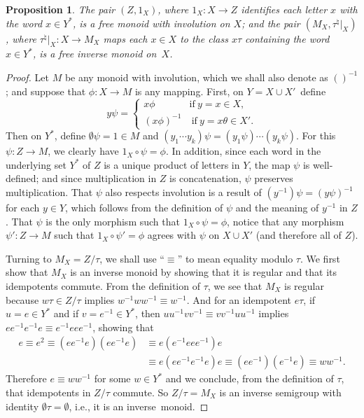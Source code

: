 \documentclass{surv-l}
\numberwithin{equation}{section}
\numberwithin{table}{section}
\numberwithin{figure}{section}
\newtheorem{proposition}[equation]{Proposition}
\theoremstyle{definition}
\begin{document}
\begin{proposition}\label{prop9.42.6}
The pair $(Z,1_{X})$, where $1_{X} : X\rightarrow Z$ identifies
each letter $x$ with the word $x\in Y^{\ast}$, is a free monoid
with involution on $X$; and the pair $(M_{X},
\tau^{\natural}|_{X})$, where $\tau^{\natural}|_{X} :
X\rightarrow M_{X}$ maps each $x\in X$ to the class $ x\tau$
containing the word $x\in Y^{\ast}$, is a free inverse
monoid on~$X$.
\end{proposition}

\begin{proof} Let $M$ be any monoid with involution, which we shall also
denote as $()^{-1}$; and suppose that $\phi : X\rightarrow M$ is
any mapping. First, on $Y=X\cup X'$~define
\[
y\psi=\begin{cases}
x\phi &\mathrm{if}\ y=x\in X,\\
(x\phi)^{-1} &\ \mathrm{if}\ y=x\theta\in X'.
\end{cases}
\]
Then on $Y^{\ast}$, define $\emptyset\psi=1\in M$ and
$(y_{1}\cdots y_{k})\psi=(y_{1}\psi)\cdots(y_{k}\psi)$. For this
$\psi : Z\rightarrow M$, we clearly have $1_{X}\circ\psi=\phi$. In
addition, since each word in the underlying set $Y^{\ast}$ of $Z$
is a unique product of letters in $Y$, the map $\psi$ is
well-defined; and since multiplication in $Z$ is concatenation,
$\psi$ preserves multiplication. That $\psi$ also respects
involution is a result of $(y^{-1})\psi=(y\psi)^{-1}$ for each
$y\in Y$, which follows from the definition of $\psi$ and the
meaning of $y^{-1}$ in $Z$. That $\psi$ is the only morphism such
that $ 1_{X}\circ\psi=\phi$, notice that any morphism $\psi' :
Z\rightarrow M$ such that $ 1_{X}\circ\psi'=\phi$ agrees with
$\psi$ on $X\cup X'$ (and therefore all of $Z$).

Turning to $M_{X}=Z/\tau$, we shall use ``$\equiv$'' to mean
equality modulo $\tau$. We first show that $M_{X}$ is an inverse
monoid by showing that it is regular and that its idempotents
commute. From the definition of $\tau$, we see that $M_{X}$ is
regular because $w\tau\in Z/\tau$ implies $w^{-1}ww^{-1}\equiv
w^{-1}$. And for an idempotent $e\tau$, if $u=e\in Y^{\ast}$ and
if $v=e^{-1}\in Y^{\ast}$, then $uu^{-1}vv^{-1}\equiv
vv^{-1}uu^{-1}$ implies $ee^{-1}e^{-1}e\equiv e^{-1}eee^{-1}$,
showing that
\begin{align*}
e\equiv e^{2}\equiv(ee^{-1}e)(ee^{-1}e)&\equiv e(e^{-1}eee^{-1})e \\
&\equiv e(ee^{-1}e^{-1}e)e\equiv(ee^{-1})(e^{-1}e)\equiv ww^{-1}.
\end{align*}
Therefore $e\equiv ww^{-1}$ for some $w\in Y^{\ast}$ and we
conclude, from the definition of $\tau$, that idempotents in
$Z/\tau$ commute. So $Z/\tau=M_{X}$ is an inverse semigroup with
identity $\emptyset\tau=\emptyset$, i.e., it is an inverse~monoid.


\end{proof}
\end{document}
